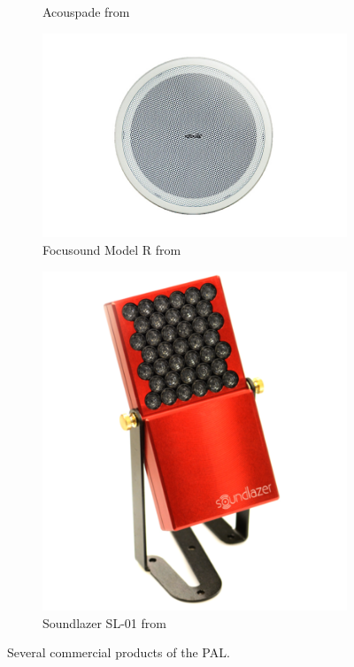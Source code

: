 \begin{figure}[!htb]
\begin{subfigure}{0.35\textwidth}
        \caption{Acouspade from \cite{UltrasonicAudioTechnologiesACOUsticSPAceDElimiter}}
    \end{subfigure}
    \hfill
    \begin{subfigure}{0.3\textwidth}
        \centering
        \includegraphics[width=\textwidth]{fig/CommercialProducts/FocusoundModelR.jpg}
        \caption{Focusound Model R from \cite{2021ProductsDescriptionsFocusound}}
    \end{subfigure}
    \hfill
    \begin{subfigure}{0.2\textwidth}
        \centering
        \includegraphics[width=\textwidth]{fig/CommercialProducts/Soundlazer_resize.png}
        \caption{Soundlazer SL-01 from \cite{2021SoundlazerPuttingSound}}
    \end{subfigure}
    \caption{Several commercial products of the PAL.}
    \label{fig:pal_commercial_product}
\end{figure}

